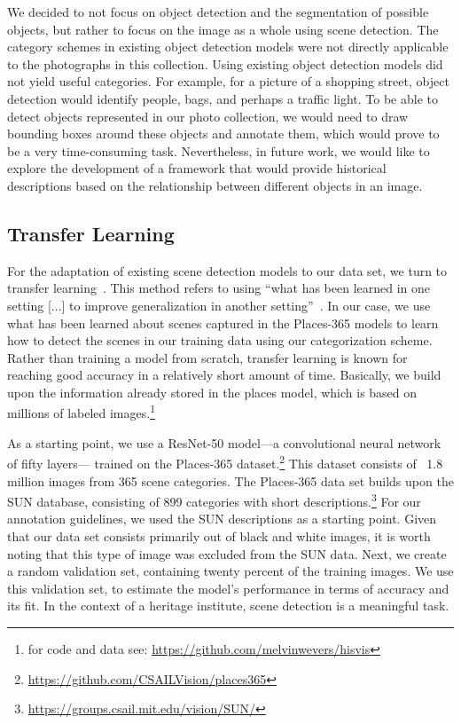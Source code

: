 \documentclass[a4paper,twoside]{article}
\begin{document}
We decided to not focus on object detection and the segmentation of possible objects, but rather to focus on the image as a whole using scene detection. 
The category schemes in existing object detection models were not directly applicable to the photographs in this collection. 
Using existing object detection models did not yield useful categories. 
For example, for a picture of a shopping street, object detection would identify people, bags, and perhaps a traffic light.
To be able to detect objects represented in our photo collection, we would need to draw bounding boxes around these objects and annotate them, which would prove to be a very time-consuming task. 
Nevertheless, in future work, we would like to explore the development of a framework that would provide historical descriptions based on the relationship between different objects in an image. 

\subsection{Transfer Learning}
\label{sec:transfer_learning}
For the adaptation of existing scene detection models to our data set, we turn to transfer learning~\cite{rawat_deep_2017}. 
This method refers to using ``what has been learned in one setting [...] to improve generalization in another setting''~\cite{goodfellow_deep_2016}. 
In our case, we use what has been learned about scenes captured in the Places-365 models to learn how to detect the scenes in our training data using our categorization scheme. 
Rather than training a model from scratch, transfer learning is known for reaching good accuracy in a relatively short amount of time. 
Basically, we build upon the information already stored in the places model, which is based on millions of labeled images.\footnote{for code and data see: \url{https://github.com/melvinwevers/hisvis}}

As a starting point, we use a ResNet-50 model---a convolutional neural network of fifty layers--- trained on the Places-365 dataset.\footnote{\url{https://github.com/CSAILVision/places365}} 
This dataset consists of ~1.8 million images from 365 scene categories.
The Places-365 data set builds upon the SUN database, consisting of 899 categories with short descriptions.\footnote{\url{https://groups.csail.mit.edu/vision/SUN/}} 
For our annotation guidelines, we used the SUN descriptions as a starting point. 
Given that our data set consists primarily out of black and white images, it is worth noting that this type of image was excluded from the SUN data.
Next, we create a random validation set, containing twenty percent of the training images. 
We use this validation set, to estimate the model's performance in terms of accuracy and its fit.
In the context of a heritage institute, scene detection is a meaningful task. 
\end{document}

